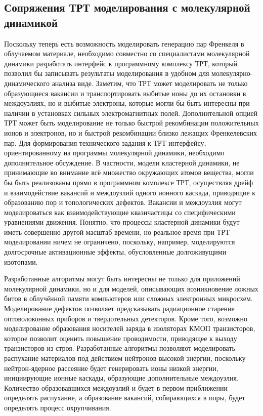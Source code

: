 \documentclass[a4paper,12pt]{article}
\begin{document}
\begin{large}
\subsection{Сопряжения ТРТ моделирования с молекулярной динамикой}
\label{Prac1}

	Поскольку теперь есть возможность моделировать генерацию пар Френкеля в облучаемом материале, необходимо совместно со специалистами молекулярной динамики разработать интерфейс к программному комплексу ТРТ, который позволил бы записывать результаты моделирования в удобном для молекулярно-динамического анализа виде.
	Заметим, что ТРТ может моделировать не только образующиеся вакансии и транспортировать выбитые ионы до их остановки в междоузлиях, но и выбитые электроны, которые могли бы быть интересны при наличии в установках сильных электромагнитных полей.
	Дополнительной опцией ТРТ может быть моделирование не только быстрой рекомбинации положительных ионов и электронов, но и быстрой рекомбинации близко лежащих Френкелевских пар.
	Для формирования технического задания к ТРТ интерфейсу, ориентированному на программы молекулярной динамики, необходимо дополнительное обсуждение.
	В частности, модели кластерной динамики, не принимающие во внимание всё множество окружающих атомов вещества, могли бы быть реализованы прямо в программном комплексе ТРТ, осуществляя дрейф и взаимодействие вакансий и междоузлий одного ионного каскада, приводящие к образованию пор и топологических дефектов.
	Вакансии и междоузлия могут моделироваться как взаимодействующие квазичастицы со специфическими уравнениями движения.
	Понятно, что процессы кластерной динамики будут иметь совершенно другой масштаб времени, но реальное время при ТРТ моделировании ничем не ограничено, поскольку, например, моделируются долгосрочные активационные эффекты, обусловленные долгоживущими изотопами.

	Разработанные алгоритмы могут быть интересны не только для приложений молекулярной динамики, но и для моделей, описывающих возникновение ложных битов в облучённой памяти компьютеров или сложных электронных микросхем.
	Моделирование дефектов позволяет предсказывать радиационное старение оптоволоконных приборов и твердотельных детекторов.
	Кроме того, возможно моделирование образования носителей заряда в изоляторах КМОП транзисторов, которое позволит оценить повышение проводимости, приводящее к выходу транзисторов из строя.
	Разработанные алгоритмы позволяют моделировать распухание материалов под действием нейтронов высокой энергии, поскольку нейтрон-ядерное рассеяние будет генерировать ионы низкой энергии, инициирующие ионные каскады, образующие дополнительные междоузлия.
	Количество образовавшихся междоузлий и будет в первом приближении определять распухание, а образование вакансий, собирающихся в поры, будет определять процесс охрупчивания.


\end{large}
\end{document}
